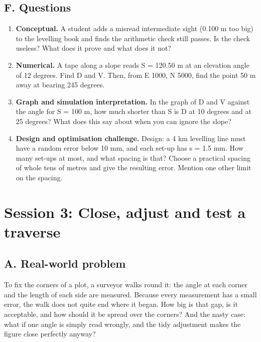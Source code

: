 \documentclass[11pt,a4paper]{article}
\begin{document}
\subsection*{F. Questions}
\begin{enumerate}[nosep]
\item \textbf{Conceptual.} A student adds a misread intermediate sight (0.100 m too big) to the levelling book and finds the arithmetic check still passes. Is the check useless? What does it prove and what does it not?
\item \textbf{Numerical.} A tape along a slope reads S = 120.50 m at an elevation angle of 12 degrees. Find D and V. Then, from E 1000, N 5000, find the point 50 m away at bearing 245 degrees.
\item \textbf{Graph and simulation interpretation.} In the graph of D and V against the angle for S = 100 m, how much shorter than S is D at 10 degrees and at 25 degrees? What does this say about when you can ignore the slope?
\item \textbf{Design and optimisation challenge.} Design: a 4 km levelling line must have a random error below 10 mm, and each set-up has s = 1.5 mm. How many set-ups at most, and what spacing is that? Choose a practical spacing of whole tens of metres and give the resulting error. Mention one other limit on the spacing.
\end{enumerate}

\section{Session 3: Close, adjust and test a traverse}

\subsection*{A. Real-world problem}
To fix the corners of a plot, a surveyor walks round it: the angle at each corner and the length of each side are measured. Because every measurement has a small error, the walk does not quite end where it began. How big is that gap, is it acceptable, and how should it be spread over the corners? And the nasty case: what if one angle is simply read wrongly, and the tidy adjustment makes the figure close perfectly anyway?
\end{document}
